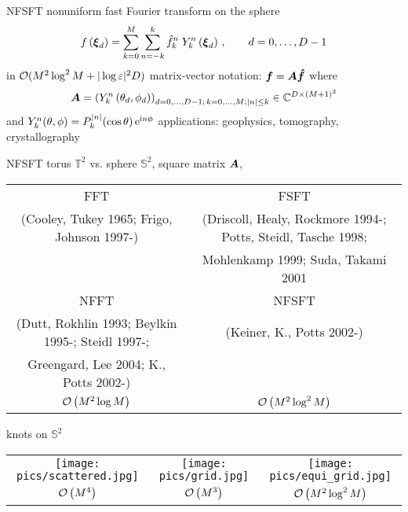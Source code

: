 \newpage
\hypertarget{nfsft}{}
{\color{blue} NFSFT}
\vfill
nonuniform fast Fourier transform on the sphere
\begin{equation*}
  f\left(\mbox{\boldmath $\xi$}_d\right)=\sum\limits_{k=0}^{M} \sum\limits_{n=-k}^{k} {\hat
  f}_k^n \; Y_k^n\left(\mbox{\boldmath $\xi$}_d\right)\,, \qquad d =0,\ldots,D-1
\end{equation*}
in ${\cal O}(M^2 \log^2 M + |\log\varepsilon|^2D)$
\vfill
matrix-vector notation: $\mbox{\boldmath $f$}=\mbox{\boldmath $A$} \mbox{\boldmath $\hat f$}$ where
\begin{equation*}
\mbox{\boldmath $A$}=\left(Y_k^n\left(\theta_d,\phi_d\right)\right)_
{d=0,\hdots,D-1;\,k=0,\hdots,M; |n| \le k} \in \mathbb{C}^{D \times \left(M+1\right)^2}
\end{equation*}
and $Y_k^n(\theta,\phi)=P_k^{|n|}(\cos\theta) \,\mathrm {e}^{\mbox{\rm \scriptsize i} n\phi}$
\vfill
applications: geophysics, tomography, crystallography
\vfill

\newpage
{\color{blue} NFSFT}
\vfill
torus $\mathbb{T}^2$ vs. sphere $\mathbb{S}^2$, square matrix $\mbox{\boldmath $A$}$,
\begin{center}
 \begin{tabular}{c c}
  FFT                      & FSFT\\
  {\tiny (Cooley, Tukey 1965; Frigo, Johnson 1997-)}         &
  {\tiny(Driscoll, Healy, Rockmore 1994-; Potts, Steidl, Tasche 1998;}\\ &
  {\tiny Mohlenkamp 1999; Suda, Takami 2001}\\[1.5ex]
  NFFT                   & NFSFT\\
  {\tiny(Dutt, Rokhlin 1993; Beylkin 1995-; Steidl 1997-;} &
  {\tiny (Keiner, K., Potts 2002-)}\\ 
  {\tiny Greengard, Lee 2004; K., Potts 2002-)} & \\[1.5ex]
  ${\cal{O}}\left(M^2 \log M\right)$ & ${\cal{O}}\left(M^2 \log^2 M\right)$\\
 \end{tabular}
\end{center}
\vfill
knots on $\mathbb{S}^2$
\begin{center}
 \begin{tabular}{c c c}
   \texttt{[image: pics/scattered.jpg]}
   &
   \texttt{[image: pics/grid.jpg]}
   &
   \texttt{[image: pics/equi\_grid.jpg]}\\
   ${\cal{O}}\left(M^4\right)$ & ${\cal{O}}\left(M^3\right)$ &
   ${\cal{O}}\left(M^2 \log^2 M\right)$
 \end{tabular}
\end{center}
\vfill


